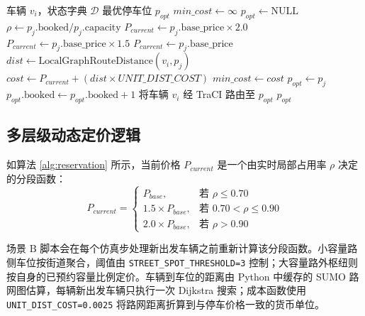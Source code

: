\documentclass[conference]{IEEEtran}
\begin{document}
\begin{algorithm}[htbp]
    \caption{动态定价与预约引擎}
    \label{alg:reservation}
    \begin{algorithmic}[1]
        \REQUIRE 车辆 $v_i$，状态字典 $\mathcal{D}$
        \ENSURE 最优停车位 $p_{opt}$
        \STATE $min\_cost \gets \infty$
        \STATE $p_{opt} \gets \text{NULL}$
        \STATE $\rho \gets p_j.\text{booked} / p_j.\text{capacity}$
        \STATE $P_{current} \gets p_j.\text{base\_price} \times 2.0$
        \STATE $P_{current} \gets p_j.\text{base\_price} \times 1.5$
        \ELSE
        \STATE $P_{current} \gets p_j.\text{base\_price}$
        \ENDIF
        \STATE $dist \gets \text{LocalGraphRouteDistance}(v_i, p_j)$
        \STATE $cost \gets P_{current} + (dist \times UNIT\_DIST\_COST)$
        \STATE $min\_cost \gets cost$
        \STATE $p_{opt} \gets p_j$
        \ENDIF
        \ENDIF
        \ENDFOR
        \STATE $p_{opt}.\text{booked} \gets p_{opt}.\text{booked} + 1$
        \STATE 将车辆 $v_i$ 经 TraCI 路由至 $p_{opt}$
        \ENDIF
        \RETURN $p_{opt}$
    \end{algorithmic}
\end{algorithm}

\subsection{多层级动态定价逻辑}
如算法 \ref{alg:reservation} 所示，当前价格 $P_{current}$ 是一个由实时局部占用率 $\rho$ 决定的分段函数：
\begin{equation}
    P_{current} =
    \begin{cases}
        P_{base},            & \text{若 } \rho \le 0.70        \\
        1.5 \times P_{base}, & \text{若 } 0.70 < \rho \le 0.90 \\
        2.0 \times P_{base}, & \text{若 } \rho > 0.90
    \end{cases}
\end{equation}

场景 B 脚本会在每个仿真步处理新出发车辆之前重新计算该分段函数。小容量路侧车位按街道聚合，阈值由 \texttt{STREET\_SPOT\_THRESHOLD=3} 控制；大容量路外枢纽则按自身的已预约容量比例定价。车辆到车位的距离由 Python 中缓存的 SUMO 路网图估算，每辆新出发车辆只执行一次 Dijkstra 搜索；成本函数使用 \texttt{UNIT\_DIST\_COST=0.0025} 将路网距离折算到与停车价格一致的货币单位。
\end{document}
